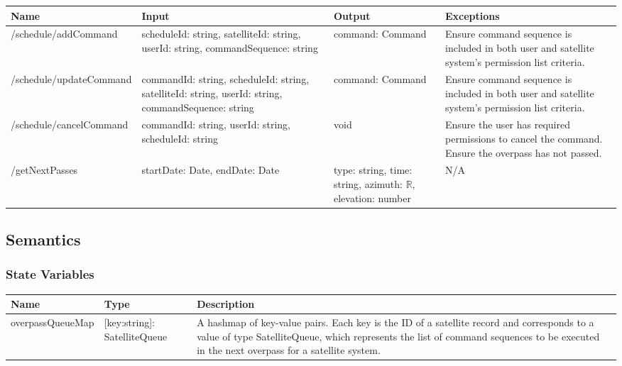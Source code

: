 \documentclass[12pt, titlepage]{article}
\begin{document}
\begin{center}
\begin{tabular}{|p{4.8cm} | p{4cm} |p{3cm} |p{5cm}|}
\hline
\textbf{Name} & \textbf{Input} & \textbf{Output} & \textbf{Exceptions} \\
\hline
/schedule/addCommand & scheduleId: string, satelliteId: string, userId: string, commandSequence: string & command: Command
 & Ensure command sequence is included in both user and satellite system’s permission list criteria. \\
\hline
/schedule/updateCommand & commandId: string, scheduleId: string, satelliteId: string, userId: string, commandSequence: string & command: Command & Ensure command sequence is included in both user and satellite system’s permission list criteria. \\
\hline
/schedule/cancelCommand & commandId: string, userId: string, scheduleId: string & void & Ensure the user has required permissions to cancel the command. Ensure the overpass has not passed.
 \\
\hline
/getNextPasses & startDate: Date, endDate: Date & type: string, time: string, azimuth: $\mathbb{R}$, elevation: number & N/A \\
\hline

\end{tabular}

\end{center}

\subsection{Semantics}

\subsubsection{State Variables}

\begin{center}
\begin{tabular}{|p{4.8cm} |p{3cm} |p{5cm} |p{4cm}|}
\hline
\textbf{Name} & \textbf{Type} & \textbf{Description} \\
\hline
overpassQueueMap & { [key:string]:
   SatelliteQueue } & A hashmap of key-value pairs. Each key is the ID of a satellite record and corresponds to a value of type SatelliteQueue, which represents the list of command sequences to be executed in the next overpass for a satellite system.\\
\hline

\end{tabular}

\end{center}
\end{document}
